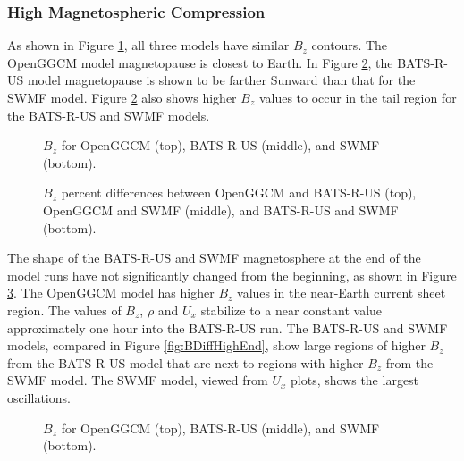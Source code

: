 \subsubsection{High Magnetospheric Compression}
As shown in Figure \ref{fig:BHighCompressionBeginning}, all three models have
similar $B_z$ contours. The OpenGGCM model magnetopause is closest to Earth.
In Figure \ref{fig:BDiffHighBeginning}, the BATS-R-US model magnetopause is
shown to be farther Sunward than that for the SWMF model. Figure
\ref{fig:BDiffHighBeginning} also shows higher $B_z$ values
to occur in the tail region for the BATS-R-US and SWMF models.

\begin{figure}
	\centering
	\caption{$B_z$ for OpenGGCM (top), BATS-R-US (middle), and SWMF (bottom).}
	\figSpace
	\label{fig:BHighCompressionBeginning}
\end{figure}

\begin{figure}
	\centering
    \caption{$B_z$ percent differences between OpenGGCM and BATS-R-US (top),
    OpenGGCM and SWMF (middle), and BATS-R-US and SWMF (bottom).
    }
    \label{fig:BDiffHighBeginning}
	\figSpace
\end{figure}

The shape of the BATS-R-US and SWMF magnetosphere at the end of the model runs have
not significantly changed from the beginning, as shown in Figure
\ref{fig:BHighCompressionEnd}. The OpenGGCM model has higher $B_z$ values in the
near-Earth current sheet region. The values of $B_z$, $\rho$ and $U_x$ stabilize to a near constant value approximately one hour into the BATS-R-US run. The BATS-R-US and SWMF models, 
compared in Figure \ref{fig:BDiffHighEnd}, show large regions of higher $B_z$ from the BATS-R-US
model that are next to regions with higher $B_z$ from the SWMF model. The SWMF model,
viewed from $U_x$ plots, shows the largest oscillations.
\begin{figure}
	\centering
	\caption{$B_z$ for OpenGGCM (top), BATS-R-US (middle), and SWMF (bottom).}
	\figSpace
	\label{fig:BHighCompressionEnd}
\end{figure}

